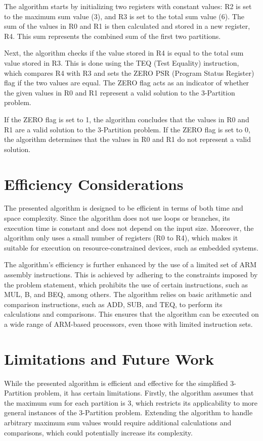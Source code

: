 The algorithm starts by initializing two registers with constant values: R2 is set to the maximum sum value (3), and R3 is set to the total sum value (6). The sum of the values in R0 and R1 is then calculated and stored in a new register, R4. This sum represents the combined sum of the first two partitions.

Next, the algorithm checks if the value stored in R4 is equal to the total sum value stored in R3. This is done using the TEQ (Test Equality) instruction, which compares R4 with R3 and sets the ZERO PSR (Program Status Register) flag if the two values are equal. The ZERO flag acts as an indicator of whether the given values in R0 and R1 represent a valid solution to the 3-Partition problem.

If the ZERO flag is set to 1, the algorithm concludes that the values in R0 and R1 are a valid solution to the 3-Partition problem. If the ZERO flag is set to 0, the algorithm determines that the values in R0 and R1 do not represent a valid solution.

\section{Efficiency Considerations}

The presented algorithm is designed to be efficient in terms of both time and space complexity. Since the algorithm does not use loops or branches, its execution time is constant and does not depend on the input size. Moreover, the algorithm only uses a small number of registers (R0 to R4), which makes it suitable for execution on resource-constrained devices, such as embedded systems.

The algorithm's efficiency is further enhanced by the use of a limited set of ARM assembly instructions. This is achieved by adhering to the constraints imposed by the problem statement, which prohibits the use of certain instructions, such as MUL, B, and BEQ, among others. The algorithm relies on basic arithmetic and comparison instructions, such as ADD, SUB, and TEQ, to perform its calculations and comparisons. This ensures that the algorithm can be executed on a wide range of ARM-based processors, even those with limited instruction sets.

\section{Limitations and Future Work}

While the presented algorithm is efficient and effective for the simplified 3-Partition problem, it has certain limitations. Firstly, the algorithm assumes that the maximum sum for each partition is 3, which restricts its applicability to more general instances of the 3-Partition problem. Extending the algorithm to handle arbitrary maximum sum values would require additional calculations and comparisons, which could potentially increase its complexity.

